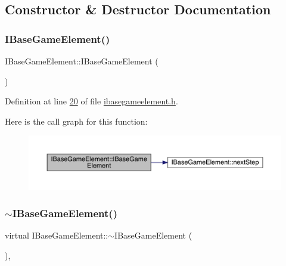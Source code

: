 \subsection{Constructor \& Destructor Documentation}
\mbox{\label{a00137_ae72e1c7b4ecb3cf88e2a86ff4a331e88}} 
\subsubsection{\texorpdfstring{I\+Base\+Game\+Element()}{IBaseGameElement()}}
{\footnotesize\ttfamily I\+Base\+Game\+Element\+::\+I\+Base\+Game\+Element (\begin{DoxyParamCaption}{ }\end{DoxyParamCaption})\hspace{0.3cm}{\ttfamily [inline]}}



Definition at line \hyperlink{a00047_source_l00020}{20} of file \hyperlink{a00047_source}{ibasegameelement.\+h}.

Here is the call graph for this function\+:
\nopagebreak
\begin{figure}[H]
\begin{center}
\leavevmode
\includegraphics[width=350pt]{d2/df5/a00137_ae72e1c7b4ecb3cf88e2a86ff4a331e88_cgraph}
\end{center}
\end{figure}
\mbox{\label{a00137_a01bfcab29a22628978a22b0f7db58623}} 
\subsubsection{\texorpdfstring{$\sim$\+I\+Base\+Game\+Element()}{~IBaseGameElement()}}
{\footnotesize\ttfamily virtual I\+Base\+Game\+Element\+::$\sim$\+I\+Base\+Game\+Element (\begin{DoxyParamCaption}{ }\end{DoxyParamCaption})\hspace{0.3cm}{\ttfamily [inline]}, {\ttfamily [virtual]}}



